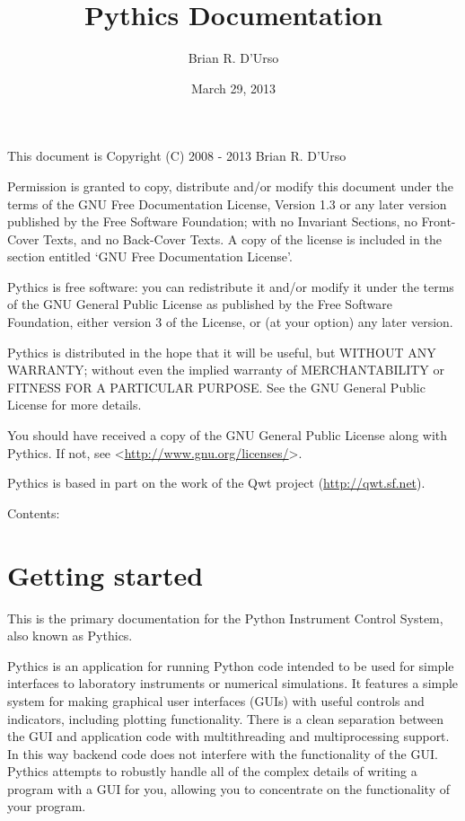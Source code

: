 \documentclass[letterpaper,10pt,english]{sphinxmanual}
\title{Pythics Documentation}
\date{March 29, 2013}
\author{Brian R. D'Urso}
\begin{document}
\maketitle
\tableofcontents
{}\label{index::doc}


This document is Copyright (C) 2008 - 2013 Brian R. D'Urso

Permission is granted to copy, distribute and/or modify this document under the
terms of the GNU Free Documentation License, Version 1.3 or any later version
published by the Free Software Foundation; with no Invariant Sections, no
Front-Cover Texts, and no Back-Cover Texts. A copy of the license is included
in the section entitled `GNU Free Documentation License'.

Pythics is free software: you can redistribute it and/or modify it under the
terms of the GNU General Public License as published by the Free Software
Foundation, either version 3 of the License, or (at your option) any later
version.

Pythics is distributed in the hope that it will be useful, but WITHOUT ANY
WARRANTY; without even the implied warranty of MERCHANTABILITY or FITNESS FOR A
PARTICULAR PURPOSE. See the GNU General Public License for more details.

You should have received a copy of the GNU General Public License
along with Pythics. If not, see \textless{}\href{http://www.gnu.org/licenses/}{http://www.gnu.org/licenses/}\textgreater{}.

Pythics is based in part on the work of the Qwt project (\href{http://qwt.sf.net}{http://qwt.sf.net}).

Contents:


\chapter{Getting started}
\label{getting_started:getting-started}\label{getting_started:pythics-python-instrument-control-system}\label{getting_started::doc}\label{getting_started:id1}
This is the primary documentation for the Python Instrument Control System,
also known as Pythics.

Pythics is an application for running Python code intended to be used for simple
interfaces to laboratory instruments or numerical simulations. It features a
simple system for making graphical user interfaces (GUIs) with useful controls
and indicators, including plotting functionality. There is a clean separation
between the GUI and application code with multithreading and multiprocessing
support. In this way backend code does not interfere with the functionality of
the GUI. Pythics attempts to robustly handle all of the complex details of
writing a program with a GUI for you, allowing you to concentrate on the
functionality of your program.
\end{document}
